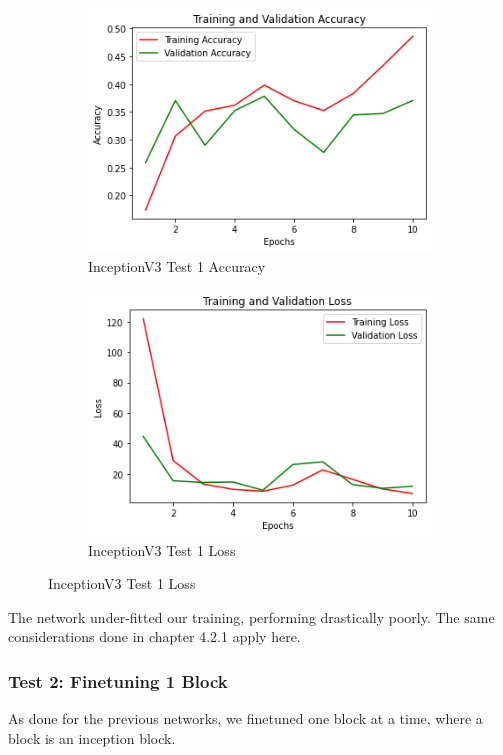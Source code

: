 \begin{figure}[H]
	\begin{subfigure}{0.5\textwidth}
		\includegraphics[width=0.9\linewidth]{img/inception/inceptionfeacc.png} 
		\caption{InceptionV3 Test 1 Accuracy}
		\label{fig:inceptionfeacc}
	\end{subfigure}
	\begin{subfigure}{0.5\textwidth}
		\includegraphics[width=0.9\linewidth]{img/inception/inceptionfeloss.png}
		\caption{InceptionV3 Test 1 Loss}
		\label{fig:inceptionfeloss}
	\end{subfigure}
\end{figure}

The network under-fitted our training, performing drastically poorly. The same considerations done in chapter 4.2.1 apply here.



\subsubsection{Test 2: Finetuning 1 Block}
As done for the previous networks, we finetuned one block at a time, where a block is an inception block.

